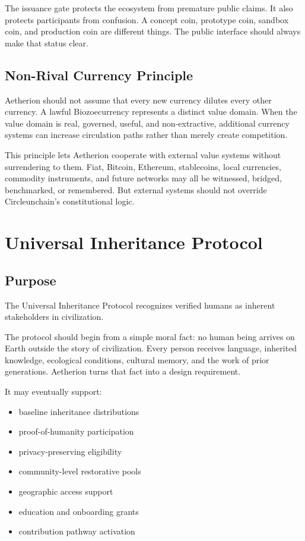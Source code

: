 \documentclass[12pt]{article}
\begin{document}
The issuance gate protects the ecosystem from premature public claims. It also protects participants from confusion. A concept coin, prototype coin, sandbox coin, and production coin are different things. The public interface should always make that status clear.

\subsection{Non-Rival Currency Principle}

Aetherion should not assume that every new currency dilutes every other currency. A lawful Biozoecurrency represents a distinct value domain. When the value domain is real, governed, useful, and non-extractive, additional currency systems can increase circulation paths rather than merely create competition.

This principle lets Aetherion cooperate with external value systems without surrendering to them. Fiat, Bitcoin, Ethereum, stablecoins, local currencies, commodity instruments, and future networks may all be witnessed, bridged, benchmarked, or remembered. But external systems should not override Circleunchain's constitutional logic.

\section{Universal Inheritance Protocol}

\subsection{Purpose}

The Universal Inheritance Protocol recognizes verified humans as inherent stakeholders in civilization.

The protocol should begin from a simple moral fact: no human being arrives on Earth outside the story of civilization. Every person receives language, inherited knowledge, ecological conditions, cultural memory, and the work of prior generations. Aetherion turns that fact into a design requirement.

It may eventually support:

\begin{itemize}
  \item baseline inheritance distributions
  \item proof-of-humanity participation
  \item privacy-preserving eligibility
  \item community-level restorative pools
  \item geographic access support
  \item education and onboarding grants
  \item contribution pathway activation
\end{itemize}
\end{document}
